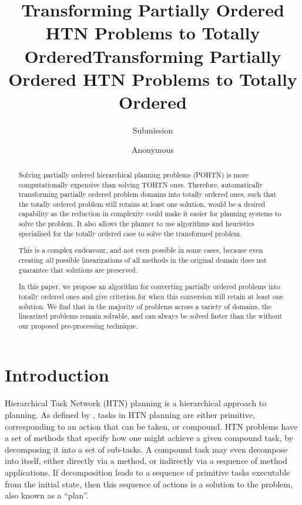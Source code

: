 \documentclass[letterpaper]{article} %
\author {
    Submission
}
\title{Transforming Partially Ordered HTN Problems to Totally Ordered}
\author {
    Anonymous

}
\title{Transforming Partially Ordered HTN Problems to Totally Ordered}
\begin{document}
\maketitle

\begin{abstract}
Solving partially ordered hierarchical planning problems (POHTN) is more computationally expensive than solving TOHTN ones. Therefore, automatically transforming partially ordered problem domains into totally ordered ones, such that the totally ordered problem still retains at least one solution, would be a desired capability as the reduction in complexity could make it easier for planning systems to solve the problem. It also allows the planner to use algorithms and heuristics specialised for the totally ordered case to solve the transformed problem. 

This is a complex endeavour, and not even possible in some cases, because even creating \emph{all} possible linearizations of all methods in the original domain does not guarantee that solutions are preserved. 

In this paper, we propose an algorithm for converting partially ordered problems into totally ordered ones and give criterion for when this conversion will retain at least one solution. We find that in the majority of problems across a variety of domains, the linearized problems remain solvable, and can always be solved faster than the without our proposed pre-processing technique. 
\end{abstract}
 
 

 
 
 
\section{Introduction}
Hierarchical Task Network (HTN) planning is a hierarchical approach to planning. As defined by \cite{HTNSurvey},  %
tasks in HTN planning are either primitive, corresponding to an action that can be taken, or compound. HTN problems have a set of methods that specify how one might achieve a given compound task, by decomposing it into a set of sub-tasks. A compound task may even decompose into itself, either directly via a method, or indirectly via a sequence of method applications. If decomposition leads to a sequence of primitive tasks executable from the initial state, then this sequence of actions is a solution to the problem, also known as a \enquote{plan}. 
\end{document}
